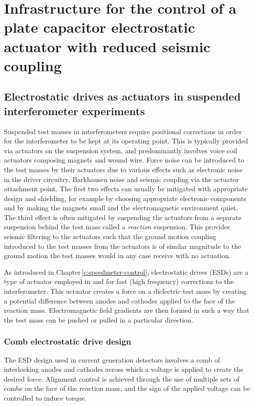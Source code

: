 \chapter{\label{c:esd-concept}Infrastructure for the control of a plate capacitor electrostatic actuator with reduced seismic coupling}

\section{Electrostatic drives as actuators in suspended interferometer experiments}
Suspended test masses in interferometers require positional corrections in order for the interferometer to be kept at its operating point. This is typically provided via actuators on the suspension system, and predominantly involves voice coil actuators composing magnets and wound wire. Force noise can be introduced to the test masses by their actuators due to various effects such as electronic noise in the driver circuitry, Barkhausen noise \cite{Weiss2008} and seismic coupling via the actuator attachment point. The first two effects can usually be mitigated with appropriate design and shielding, for example by choosing appropriate electronic components and by making the magnets small and the electromagnetic environment quiet. The third effect is often mitigated by suspending the actuators from a separate suspension behind the test mass called a \emph{reaction} suspension. This provides seismic filtering to the actuators such that the ground motion coupling introduced to the test masses from the actuators is of similar magnitude to the ground motion the test masses would in any case receive with no actuation.

As introduced in Chapter\,\ref{c:speedmeter-control}, electrostatic drives (\glspl{ESD}) are a type of actuator employed in \GEO{} and \ALIGO{} for fast (high frequency) corrections to the interferometer. This actuator creates a force on a dielectric test mass by creating a potential difference between anodes and cathodes applied to the face of the reaction mass. Electromagnetic field gradients are then formed in such a way that the test mass can be pushed or pulled in a particular direction.

\subsection{Comb electrostatic drive design}
The \gls{ESD} design used in current generation detectors involves a comb of interlocking anodes and cathodes across which a voltage is applied to create the desired force. Alignment control is achieved through the use of multiple sets of combs on the face of the reaction mass, and the sign of the applied voltage can be controlled to induce torque.

